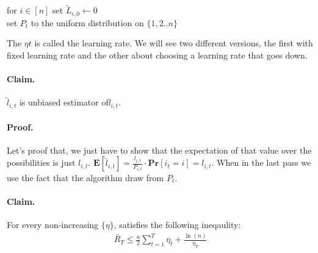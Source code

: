\documentclass{article}
\newcommand{\prb}[1]{ \mathbf{Pr} \left[ {#1} \right]}
\newcommand{\expp}[1]{ \mathbf{E} \left[ {#1} \right]}
\begin{document}
\begin{multicols*}{2}
 \begin{algorithm}[H]
   for $i \in [n]$ set  $\tilde{L}_{i,0} \leftarrow 0 $\\
   set $P_{t}$ to the uniform distribution on $\{1,2 .. n \}$ \\ 
 \end{algorithm}
 The $\eta{t}$ is called the learning rate. We will see two different versions, the first with fixed learning rate and the other about choosing a learning rate that goes down. 

 \paragraph{Claim.} $\tilde{l}_{i,t}$ is unbiased estimator of$l_{i,t}$. 
 \paragraph{Proof.}
 Let's proof that, we just have to show that the expectation of that value over the possibilities is just $l_{i,t}$. $\expp{\tilde{l}_{i,t}} = \frac{l_{i,t}}{P_{i,t}} \cdot \prb{i_{t}=i} = l_{i,t}$. When in the last pass we use the fact that the algorithm draw from $P_{t}$.  

 \paragraph{Claim.} For every non-increasing $\{\eta\}$,  satisfies the following ineqaulity:  
 \begin{equation*}
   \begin{split}
     \bar{R}_{T} \le \frac{n}{2}\sum_{t=1}^{T}{\eta_{t}} + \frac{\ln(n)}{\eta_{T}} 
   \end{split}
 \end{equation*}

\end{multicols*}
\end{document}
